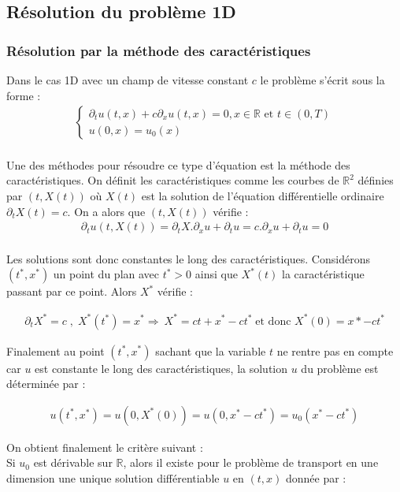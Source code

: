 \documentclass[12pt]{article}
\begin{document}
\subsection{Résolution du problème 1D}
\subsubsection{Résolution par la méthode des caractéristiques}
Dans le cas 1D avec un champ de vitesse constant $c$ le problème s'écrit sous la forme :
\begin{eqnarray}
    \left\{ 
    \begin{array}{llll}
        \partial_tu(t,x) + c\partial_xu(t,x)=0, x \in \mathbb{R} \text{ et } t \in (0,T)
        \\u(0,x)=u_0(x)
        \end{array}
    \right .
\end{eqnarray}
\\
Une des méthodes pour résoudre ce type d'équation est la méthode des caractéristiques. On définit les caractéristiques comme les courbes de $\mathbb{R}^2$ définies par $(t,X(t))$ où $X(t)$ est la solution de l'équation différentielle ordinaire $\partial_tX(t)=c$.
On a alors que $(t,X(t))$ vérifie :
\\
\begin{eqnarray}
        \partial_tu(t,X(t))=\partial_tX.\partial_xu+\partial_tu
        =c.\partial_xu+\partial_tu =0
\end{eqnarray}
\\
Les solutions sont donc constantes le long des caractéristiques. 
Considérons $(t^*,x^*)$ un point du plan avec $t^*>0$ ainsi que $X^*(t)$ la caractéristique passant par ce point. Alors $X^*$ vérifie :

\begin{eqnarray}
        \partial_tX^*=c \;,\;  X^*(t^*)=x^*
        \Rightarrow\ X^*=ct+x^*-ct^*\; \text{et donc } X^*(0)=x*-ct^*
\end{eqnarray}

Finalement au point $(t^*,x^*)$ sachant que la variable $t$ ne rentre pas en compte car $u$ est constante le long des caractéristiques, la solution $u$ du problème est déterminée par :

\begin{eqnarray}
u(t^*,x^*)=u(0,X^*(0))=u(0,x^*-ct^*)=u_0(x^*-ct^*)
\end{eqnarray}

On obtient finalement le critère suivant :
\\ Si $u_0$ est dérivable sur $\mathbb{R}$, alors il existe pour le problème de transport en une dimension une unique solution différentiable $u$ en $(t,x)$  donnée par :
\end{document}
